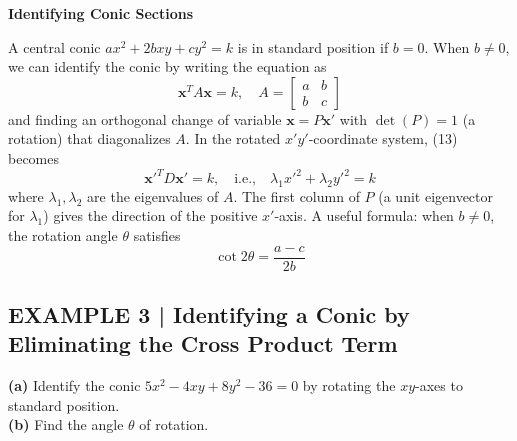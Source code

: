 \documentclass{article}
\newcommand{\redheading}[1]{{\vspace{2mm}\noindent\Large\bfseries\color{red!55!black} #1\par}\vspace{2mm}}
\begin{document}
\redheading{Identifying Conic Sections}

A central conic $ax^2+2bxy+cy^2=k$ is in standard position if $b=0$. When $b\neq0$, we can
identify the conic by writing the equation as
\begin{equation}
  \mathbf{x}^T A\mathbf{x}=k,\quad A=\begin{bmatrix}a&b\\b&c\end{bmatrix} \tag{13}
\end{equation}
and finding an orthogonal change of variable $\mathbf{x}=P\mathbf{x}'$ with $\det(P)=1$
(a rotation) that diagonalizes $A$. In the rotated $x'y'$-coordinate system, (13) becomes
\begin{equation}
  \mathbf{x}'^T D\mathbf{x}'=k,\quad\text{i.e.,}\quad \lambda_1x'^2+\lambda_2y'^2=k \tag{17}
\end{equation}
where $\lambda_1,\lambda_2$ are the eigenvalues of $A$. The first column of $P$ (a unit eigenvector
for $\lambda_1$) gives the direction of the positive $x'$-axis. A useful formula: when $b\neq0$, the
rotation angle $\theta$ satisfies
\begin{equation}
  \boxed{\cot 2\theta = \frac{a-c}{2b}} \tag{19}
\end{equation}

\subsection*{EXAMPLE 3 | Identifying a Conic by Eliminating the Cross Product Term}

\textbf{(a)} Identify the conic $5x^2-4xy+8y^2-36=0$ by rotating the $xy$-axes to standard
position.\\ \textbf{(b)} Find the angle $\theta$ of rotation.
\end{document}
